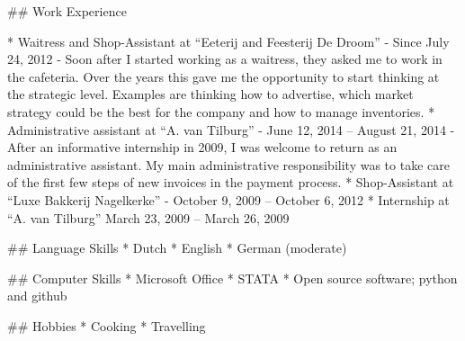 ## Work Experience

* Waitress and Shop-Assistant at “Eeterij and Feesterij De Droom”
	- Since July 24, 2012
	- Soon after I started working as a waitress, they asked me to work in the cafeteria. Over the years this gave me the opportunity to start thinking at the strategic level. Examples are thinking how to advertise, which market strategy could be the best for the company and how to manage inventories.
* Administrative assistant at “A. van Tilburg”
	- June 12, 2014 – August 21, 2014
	- After an informative internship in 2009, I was welcome to return as an administrative assistant. My main administrative responsibility was to take care of the first few steps of new invoices in the payment process.
* Shop-Assistant at “Luxe Bakkerij Nagelkerke”
	- October 9, 2009 – October 6, 2012
* Internship at “A. van Tilburg”
March 23, 2009 – March 26, 2009

## Language Skills
* Dutch
* English
* German (moderate)

## Computer Skills
* Microsoft Office
* STATA
* Open source software; python and github

## Hobbies
* Cooking
* Travelling 